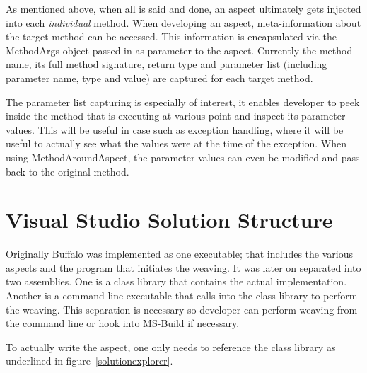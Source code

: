 As mentioned above, when all is said and done, an aspect ultimately gets injected into each \textit{individual} method. When developing an aspect, meta-information about the target method can be accessed. This information is encapsulated via the MethodArgs object passed in as parameter to the aspect. Currently the method name, its full method signature, return type and parameter list (including parameter name, type and value) are captured for each target method.

The parameter list capturing is especially of interest, it enables developer to peek inside the method that is executing at various point and inspect its parameter values. This will be useful in case such as exception handling, where it will be useful to actually see what the values were at the time of the exception. When using MethodAroundAspect, the parameter values can even be modified and pass back to the original method.

\section{Visual Studio Solution Structure}

Originally Buffalo was implemented as one executable; that includes the various aspects and the program that initiates the weaving. It was later on separated into two assemblies. One is a class library that contains the actual implementation. Another is a command line executable that calls into the class library to perform the weaving. This separation is necessary so developer can perform weaving from the command line or hook into MS-Build if necessary. 

To actually write the aspect, one only needs to reference the class library as underlined in figure~\ref{solutionexplorer}.

